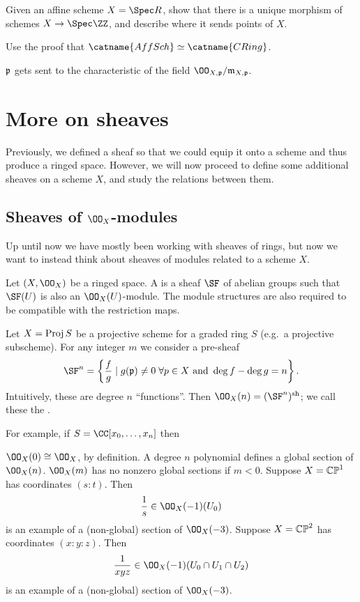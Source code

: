 \documentclass[11pt]{scrreprt}
\begin{document}
\begin{problem}
	Given an affine scheme $X = \Spec R$,
	show that there is a unique morphism of schemes $X \to \Spec \ZZ$,
	and describe where it sends points of $X$.
	\begin{hint}
		Use the proof that $\catname{AffSch} \simeq \catname{CRing}$.
	\end{hint}
	\begin{sol}
		$\mathfrak p$ gets sent to the characteristic of the field $\OO_{X,\pp} / \mm_{X,\pp}$.
	\end{sol}
\end{problem}

\chapter{More on sheaves}
Previously, we defined a sheaf so that we could equip
it onto a scheme and thus produce a ringed space.
However, we will now proceed to define some additional sheaves on a scheme $X$,
and study the relations between them.

\section{Sheaves of $\OO_X$-modules}
Up until now we have mostly been working with sheaves of rings,
but now we want to instead think about sheaves of modules related
to a scheme $X$. 
\begin{definition}
	Let $(X, \OO_X)$ be a ringed space.
	A  is a sheaf $\SF$
	of abelian groups such that $\SF(U)$ is also an $\OO_X(U)$-module.
	The module structures are also required to be compatible
	with the restriction maps.
\end{definition}
\begin{example}
	Let $X = \operatorname{Proj} S$ be a projective scheme for a graded ring $S$
	(e.g.\ a projective subscheme).
	For any integer $m$ we consider a pre-sheaf
	\[ \SF^n = \left\{ \frac fg \mid g(\pp)\neq 0 \;\forall p \in X 
		\text{ and } \deg f - \deg g = n \right\}.
	\]
	Intuitively, these are degree $n$ ``functions''.
	Then $\OO_X(n) = (\SF^n)\sh$;
	we call these the .

	For example, if $S = \CC[x_0, \dots, x_n]$ then
	\begin{enumerate}[(a)]
		\ii $\OO_X(0) \cong \OO_X$, by definition.
		\ii A degree $n$ polynomial defines a global section of $\OO_X(n)$.
		\ii $\OO_X(m)$ has no nonzero global sections if $m < 0$.
		\ii Suppose $X = \mathbb{CP}^1$ has coordinates $(s:t)$. Then
		\[ \frac 1s \in \OO_X(-1)(U_0) \]
		is an example of a (non-global) section of $\OO_X(-3)$.
		\ii Suppose $X = \mathbb{CP}^2$ has coordinates $(x:y:z)$. Then
		\[ \frac{1}{xyz} \in \OO_X(-1)(U_0 \cap U_1 \cap U_2) \]
		is an example of a (non-global) section of $\OO_X(-3)$.
	\end{enumerate}
\end{example}
\end{document}
